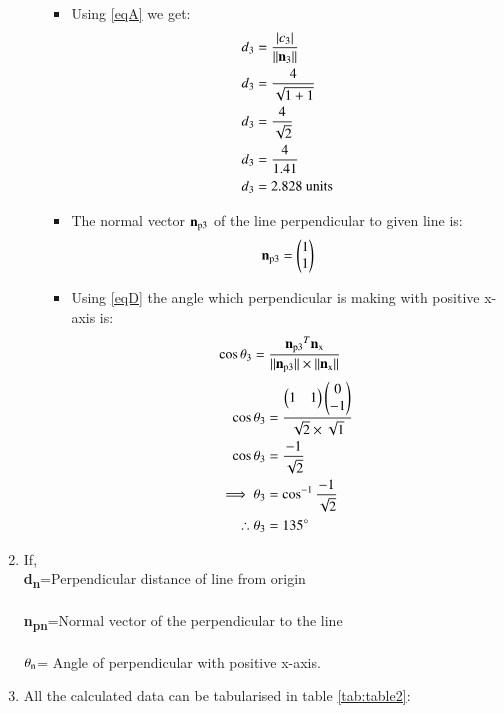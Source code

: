 \documentclass[journal,12pt,twocolumn]{IEEEtran}
\begin{document}
\begin{enumerate}
\begin{enumerate}[label=\alph*.]
\begin{itemize}
\item Using \eqref{eqA} we get:
\begin{align}
d\textsubscript{3}&=\frac { \left| c\textsubscript{3}\right| }{\norm{\vec{n\textsubscript{3}}}}
\\
d\textsubscript{3}&=\frac{4}{\sqrt{1+1}} 
\\
d\textsubscript{3}&=\frac{4}{\sqrt{2}}
\\
d\textsubscript{3}&=\frac{4}{1.41}
\\
d\textsubscript{3}&=2.828 \text{ units}
\end{align}
\item The normal vector $\vec{n\textsubscript{p3}}$ of the line perpendicular to given line is: 
\begin{align}
    \vec{n\textsubscript{p3}}=\myvec{1\\1}
\end{align}
\item Using \eqref{eqD} the angle which perpendicular is making with positive x-axis is:
\begin{align}
   \cos\theta\textsubscript{3} &= \frac{\vec{n\textsubscript{p3}}^T\vec{n\textsubscript{x}}}{\norm{\vec{n\textsubscript{p3}}}\times\norm{\vec{n\textsubscript{x}}}}
    \end{align}
    \begin{align}
   \cos\theta\textsubscript{3} &= \frac{\myvec{1&1}\myvec{0\\-1}}{\sqrt{2}\times\sqrt{1}}
    \\
 \cos\theta\textsubscript{3} &= \frac{-1}{\sqrt{2}}
 \\
 \implies \theta\textsubscript{3}&=\cos^{-1}\frac{-1}{\sqrt{2}}
 \\
 \therefore  \theta\textsubscript{3}&=135\degree
\end{align}
\end{itemize}
\end{enumerate}
\item If,
\\
\textbf{d\textsubscript{n}}=Perpendicular distance of line from origin
\\
\\
\textbf{n\textsubscript{pn}}=Normal vector of the perpendicular to the line 
\\
\\
$\theta\textsubscript{n}$= Angle of perpendicular with positive x-axis.
\item All the calculated data can be tabularised in table  \ref{tab:table2}:
\end{enumerate}
\end{document}
